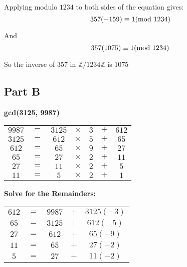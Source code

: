 \documentclass{article}
\numberwithin{equation}{subsection}
\begin{document}
	\vspace{15pt}
	Applying modulo $1234$ to both sides of the equation gives:
	\begin{equation}\notag
		357(-159) \equiv 1 (\textrm{mod}\ 1234)	
	\end{equation}
 
	\newpage
	\thispagestyle{fancy}

	And
	\begin{equation}\notag
		357(1075) \equiv 1(\textrm{mod}\ 1234)
	\end{equation}

	So the inverse of $357$ in $\mathbb{Z}/1234\mathbb{Z}$ is $1075$

	\vspace{25pt}
	\subsection*{Part B}
	\textbf{gcd(3125, 9987)}

	\begin{tabular}{c c c c c c c}
		$9987$	&	$=$	&	$3125$	&	$\times$	&	\underline{$3$}	&	$+$	&	\underline{$612$}	\\
		$3125$	&	$=$	&	$612$	&	$\times$	&	\underline{$5$}	&	$+$	&	\underline{$65$}	\\
		$612$	&	$=$	&	$65$	&	$\times$	&	\underline{$9$}	&	$+$	&	\underline{$27$}	\\
		$65$	&	$=$	&	$27$	&	$\times$	&	\underline{$2$}	&	$+$	&	\underline{$11$}	\\
		$27$	&	$=$	&	$11$	&	$\times$	&	\underline{$2$}	&	$+$	&	\underline{$5$}	\\
		$11$	&	$=$	&	$5$	&	$\times$	&	\underline{$2$}	&	$+$	&	\underline{$1$}	\\
	\end{tabular}

	\vspace{15pt}
	\textbf{Solve for the Remainders:}

	\begin{tabular}{c c c c c}
		$612$	&	$=$	&	$9987$	&	$+$	&	$3125(-3)$	\\
		$65$	&	$=$	&	$3125$	&	$+$	&	$612(-5)$	\\
		$27$	&	$=$	&	$612$	&	$+$	&	$65(-9)$	\\
		$11$	&	$=$	&	$65$	&	$+$	&	$27(-2)$	\\
		$5$	&	$=$	&	$27$	&	$+$	&	$11(-2)$	\\
	\end{tabular}
\end{document}
